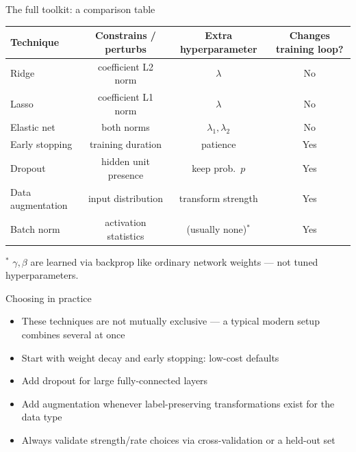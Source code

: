 \documentclass[aspectratio=169, 10pt]{beamer}
\begin{document}
\begin{frame}{The full toolkit: a comparison table}
  \begin{center}
  \small
  \begin{tabular}{lccc}
    \toprule
    \textbf{Technique} & \textbf{Constrains / perturbs} & \textbf{Extra hyperparameter} & \textbf{Changes training loop?} \\
    \midrule
    Ridge & coefficient L2 norm & $\lambda$ & No \\
    Lasso & coefficient L1 norm & $\lambda$ & No \\
    Elastic net & both norms & $\lambda_1, \lambda_2$ & No \\
    Early stopping & training duration & patience & Yes \\
    Dropout & hidden unit presence & keep prob.\ $p$ & Yes \\
    Data augmentation & input distribution & transform strength & Yes \\
    Batch norm & activation statistics & (usually none)$^*$ & Yes \\
    \bottomrule
  \end{tabular}

  \vspace{6pt}
  {\scriptsize $^*$ $\gamma, \beta$ are learned via backprop like ordinary network weights --- not tuned hyperparameters.}
  \end{center}
\end{frame}

\begin{frame}{Choosing in practice}
  \begin{itemize}
    \item These techniques are not mutually exclusive --- a typical modern setup combines several at once
    \item Start with weight decay and early stopping: low-cost defaults
    \item Add dropout for large fully-connected layers
    \item Add augmentation whenever label-preserving transformations exist for the data type
    \item Always validate strength/rate choices via cross-validation or a held-out set
  \end{itemize}
\end{frame}
\end{document}
